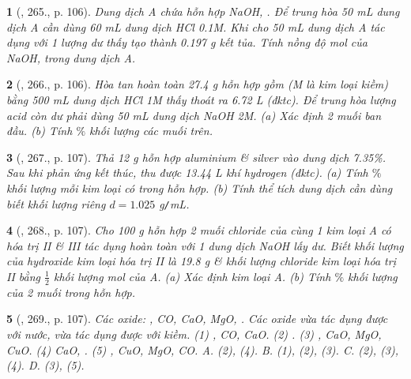 \documentclass{article}
\newtheorem{baitoan}{}
\begin{document}
\begin{baitoan}[\cite{Nguyen_Buu_Can_500_BT_Hoa_Hoc_THCS}, 265., p. 106]
	Dung dịch A chứa hỗn hợp {\rm NaOH, }. Để trung hòa {\rm50 mL} dung dịch A cần dùng {\rm60 mL} dung dịch {\rm HCl 0.1M}. Khi cho {\rm50 mL} dung dịch A tác dụng với 1 lượng dư {\rm{}} thấy tạo thành {\rm0.197 g} kết tủa. Tính nồng độ mol của {\rm NaOH, } trong dung dịch A.
\end{baitoan}

\begin{baitoan}[\cite{Nguyen_Buu_Can_500_BT_Hoa_Hoc_THCS}, 266., p. 106]
	Hòa tan hoàn toàn {\rm27.4 g} hỗn hợp gồm {\rm{}} ({\rm M} là kim loại kiềm) bằng {\rm500 mL} dung dịch {\rm HCl 1M} thấy thoát ra {\rm6.72 L } (đktc). Để trung hòa lượng acid còn dư phải dùng {\rm50 mL} dung dịch {\rm NaOH 2M}. (a) Xác định 2 muối ban đầu. (b) Tính $\%$ khối lượng các muối trên.
\end{baitoan}

\begin{baitoan}[\cite{Nguyen_Buu_Can_500_BT_Hoa_Hoc_THCS}, 267., p. 107]
	Thả {\rm12 g} hỗn hợp aluminium \& silver vào dung dịch {\rm{} 7.35\%}. Sau khi phản ứng kết thúc, thu được {\rm13.44 L} khí hydrogen (đktc). (a) Tính $\%$ khối lượng mỗi kim loại có trong hỗn hợp. (b) Tính thể tích dung dịch {\rm{}} cần dùng biết khối lượng riêng $d = 1.025$ {\rm g{\tt/}mL}.
\end{baitoan}

\begin{baitoan}[\cite{Nguyen_Buu_Can_500_BT_Hoa_Hoc_THCS}, 268., p. 107]
	Cho {\rm100 g} hỗn hợp 2 muối chloride của cùng 1 kim loại A có hóa trị {\rm II \& III} tác dụng hoàn toàn với 1 dung dịch {\rm NaOH} lấy dư. Biết khối lượng của hydroxide kim loại hóa trị {\rm II} là {\rm19.8 g} \& khối lượng chloride kim loại hóa trị {\rm II} bằng $\frac{1}{2}$ khối lượng mol của A. (a) Xác định kim loại A. (b) Tính $\%$ khối lượng của 2 muối trong hỗn hợp.
\end{baitoan}

\begin{baitoan}[\cite{Nguyen_Buu_Can_500_BT_Hoa_Hoc_THCS}, 269., p. 107]
	Các oxide: {\rm{}, CO, CaO, MgO, }. Các oxide vừa tác dụng được với nước, vừa tác dụng được với kiềm. {\rm(1) , CO, CaO. (2) . (3) , CaO, MgO, CuO. (4) CaO, . (5) , CuO, MgO, CO. {\sf A.} (2), (4). {\sf B.} (1), (2), (3). {\sf C.} (2), (3), (4). {\sf D.} (3), (5).}
\end{baitoan}
\end{document}
